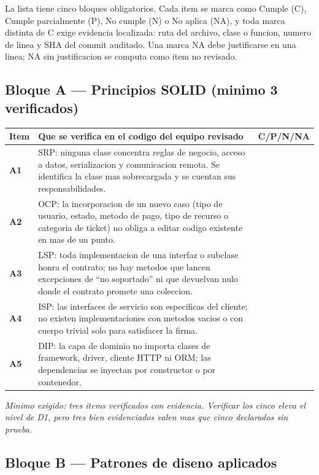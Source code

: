 \documentclass[11pt,a4paper]{article}
\begin{document}
La lista tiene cinco bloques obligatorios. Cada item se marca como Cumple (C), Cumple parcialmente (P), No cumple (N) o No aplica (NA), y toda marca distinta de C exige evidencia localizada: ruta del archivo, clase o funcion, numero de linea y SHA del commit auditado. Una marca NA debe justificarse en una linea; NA sin justificacion se computa como item no revisado.

\subsection{Bloque A --- Principios SOLID (minimo 3 verificados)}

\noindent
\begin{tabularx}{\linewidth}{@{}>{\bfseries}p{0.9cm} X >{\centering\arraybackslash}p{2.4cm}@{}}
    \toprule
    \rowcolor{uteqSoft}\textbf{\color{uteqBlue}Item} & \textbf{\color{uteqBlue}Que se verifica en el codigo del equipo revisado} & \textbf{\color{uteqBlue}C/P/N/NA} \\
    \midrule
    A1 & SRP: ninguna clase concentra reglas de negocio, acceso a datos, serializacion y comunicacion remota. Se identifica la clase mas sobrecargada y se cuentan sus responsabilidades. & \\
    A2 & OCP: la incorporacion de un nuevo caso (tipo de usuario, estado, metodo de pago, tipo de recurso o categoria de ticket) no obliga a editar codigo existente en mas de un punto. & \\
    A3 & LSP: toda implementacion de una interfaz o subclase honra el contrato; no hay metodos que lancen excepciones de ``no soportado'' ni que devuelvan nulo donde el contrato promete una coleccion. & \\
    A4 & ISP: las interfaces de servicio son especificas del cliente; no existen implementaciones con metodos vacios o con cuerpo trivial solo para satisfacer la firma. & \\
    A5 & DIP: la capa de dominio no importa clases de framework, driver, cliente HTTP ni ORM; las dependencias se inyectan por constructor o por contenedor. & \\
    \bottomrule
\end{tabularx}

\vspace{4pt}
\noindent\textit{Minimo exigido: tres items verificados con evidencia. Verificar los cinco eleva el nivel de D1, pero tres bien evidenciados valen mas que cinco declarados sin prueba.}

\subsection{Bloque B --- Patrones de diseno aplicados}
\end{document}
